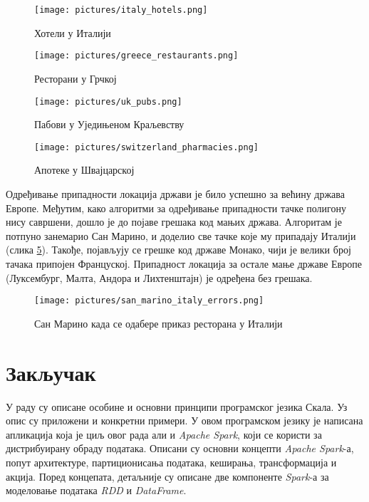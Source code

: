 \documentclass[12pt,oneside]{memoir}
\begin{document}
\begin{figure}[!ht]
  \centering
  \texttt{[image: pictures/italy\_hotels.png]}
  \caption{Хотели у Италији}
  \label{fig:app_code_italy_hotel}
\end{figure}

\begin{figure}[!ht]
  \centering
  \texttt{[image: pictures/greece\_restaurants.png]}
  \caption{Ресторани у Грчкој}
  \label{fig:app_code_greece_restaurants}
\end{figure}

\begin{figure}[!ht]
  \centering
  \texttt{[image: pictures/uk\_pubs.png]}
  \caption{Пабови у Уједињеном Краљевству}
  \label{fig:app_code_uk_pubs}
\end{figure}

\begin{figure}[!ht]
  \centering
  \texttt{[image: pictures/switzerland\_pharmacies.png]}
  \caption{Апотеке у Швајцарској}
  \label{fig:app_code_switzerland_pharmacies}
\end{figure}

Одређивање припадности локација држави је било успешно за већину држава Европе. Међутим, како алгоритми за одређивање припадности тачке полигону нису савршени, дошло је до појаве грешака код мањих држава. Алгоритам је потпуно занемарио Сан Марино, и доделио све тачке које му припадају Италији (слика \ref{fig:app_code_san_marino_italy}). Такође, појављују се грешке код државе Монако, чији је велики број тачака припојен Француској. Припадност локација за остале мање државе Европе (Луксембург, Малта, Андора и Лихтенштајн) је одређена без грешака.

\begin{figure}[!ht]
  \centering
  \texttt{[image: pictures/san\_marino\_italy\_errors.png]}
  \caption{Сан Марино када се одабере приказ ресторана у Италији}
  \label{fig:app_code_san_marino_italy}
\end{figure}

\chapter{Закључак}
\label{chp:zakljucak}

У раду су описане особине и основни принципи програмског језика Скала. Уз опис су приложени и конкретни примери. У овом програмском језику је написана апликација која је циљ овог рада али и \textit{Apache Spark}, који се користи за дистрибуирану обраду података. Описани су основни концепти \textit{Apache Spark}-а, попут архитектуре, партиционисања података, кеширања, трансформација и акција. Поред концепата, детаљније су описане две компоненте \textit{Spark}-а за моделовање података \textit{RDD} и \textit{DataFrame}.
\end{document}
